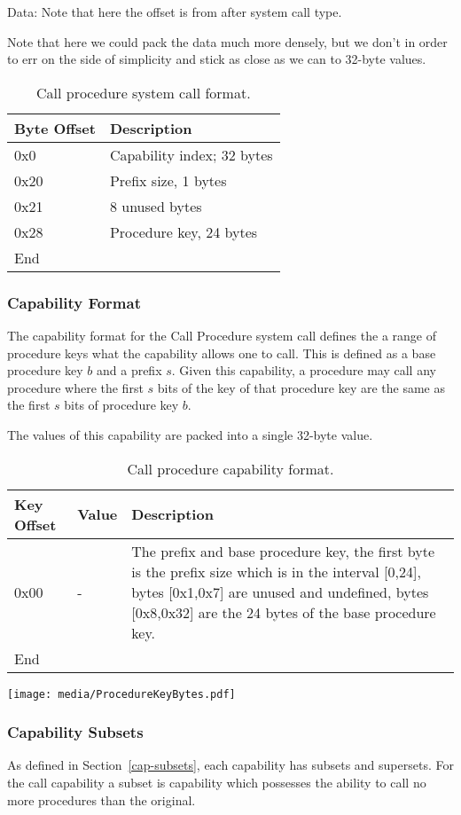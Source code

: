 \documentclass[english,a4paper]{article}
\let\oldparagraph\subsubsection
\renewcommand{\subsubsection}[1]{\oldparagraph{#1}\mbox{}}
\begin{document}
Data: Note that here the offset is from after system call type.

Note that here we could pack the data much more densely, but we don't in order
to err on the side of simplicity and stick as close as we can to 32-byte values.

\begin{table}[H]
  \caption{Call procedure system call format.}
  \centering{}%
  \begin{tabular}{l|p{}}
    \hline
    Byte Offset & Description\tabularnewline
    \hline
    \hline
    0x0 & Capability index; 32 bytes \tabularnewline
    0x20 & Prefix size, 1 bytes \tabularnewline
    0x21 & 8 unused bytes \tabularnewline
    0x28 & Procedure key, 24 bytes \tabularnewline
    \hline
    End &  \tabularnewline
    \hline
  \end{tabular}
\end{table}

\subsubsection{Capability Format}
The capability format for the Call Procedure system call defines the a range of
procedure keys what the capability allows one to call. This is defined as a base
procedure key $b$ and a prefix $s$. Given this capability, a procedure may call
any procedure where the first $s$ bits of the key of that procedure key are the
same as the first $s$ bits of procedure key $b$.

The values of this capability are packed into a single 32-byte value.

\begin{table}[H]
  \caption{Call procedure capability format.}
  \centering{}%
  \begin{tabular}{l|l|p{}}
    \hline
    Key Offset & Value & Description\tabularnewline
    \hline
    \hline
    0x00 & -    & The prefix and base procedure key, the first byte is the prefix
                 size which is in the interval [0,24], bytes [0x1,0x7] are
                 unused and undefined, bytes [0x8,0x32] are the 24 bytes of the
                 base procedure key. \tabularnewline
    \hline
    End &  \tabularnewline
    \hline
  \end{tabular}
\end{table}

\texttt{[image: media/ProcedureKeyBytes.pdf]}

\subsubsection{Capability Subsets}
As defined in Section~\ref{cap-subsets}, each capability has subsets and
supersets. For the call capability a subset is capability which possesses the
ability to call no more procedures than the original.
\end{document}
